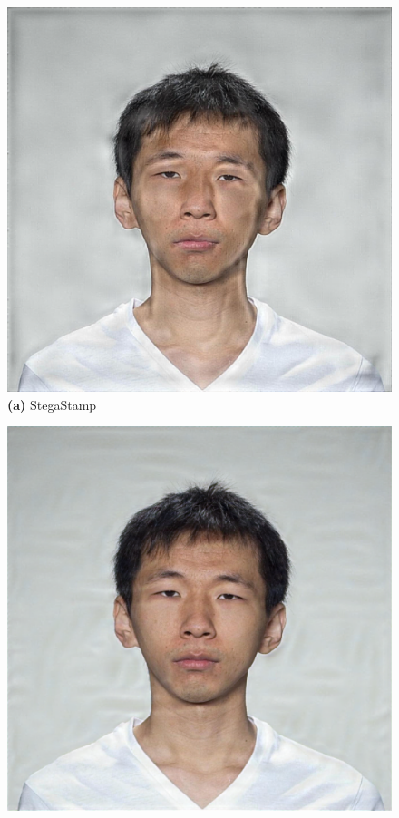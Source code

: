 \begin{figure}[ht]
    \centering
    \begin{minipage}[t]{0.2\textwidth}
        \centering
        \includegraphics[width=\textwidth]{images/005_StegaStamp_1.4.jpg}\\
        \textbf{(a)} StegaStamp
    \end{minipage}
    \hfill
    \begin{minipage}[t]{0.2\textwidth}
        \centering
        \includegraphics[width=\textwidth]{images/005_CodeFace_1.4.jpg}\\

\end{minipage}
\end{figure}
